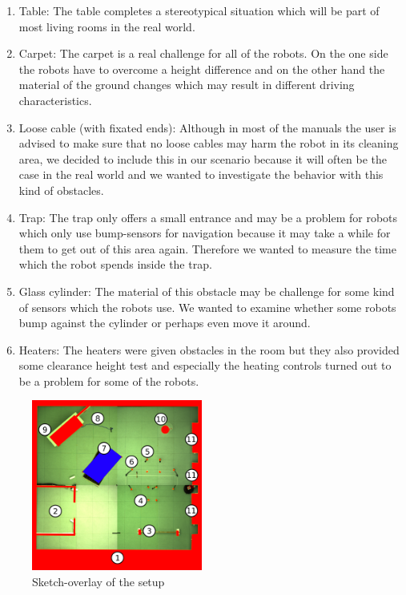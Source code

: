 \documentclass[twoside]{article}
\begin{document}
\begin{enumerate}
\item Table: The table completes a stereotypical situation which will be part of most living rooms in the real world.

\item Carpet: The carpet is a real challenge for all of the robots. On the one side the robots have to overcome a height difference and on the other hand the material of the ground changes which may result in different driving characteristics. 

\item Loose cable (with fixated ends): Although in most of the manuals the user is advised to make sure that no loose cables may harm the robot in its cleaning area, we decided to include this in our scenario because it will often be the case in the real world and we wanted to investigate the behavior with this kind of obstacles.

\item Trap: The trap only offers a small entrance and may be a problem for robots which only use bump-sensors for navigation because it may take a while for them to get out of this area again. Therefore we wanted to measure the time which the robot spends inside the trap.

\item Glass cylinder: The material of this obstacle may be challenge for some kind of sensors which the robots use. We wanted to examine whether some robots bump against the cylinder or perhaps even move it around.

\item Heaters: The heaters were given obstacles in the room but they also provided some clearance height test and especially the heating controls turned out to be a problem for some of the robots.
\end{enumerate}

\begin{figure}[H]
	\centering
	\includegraphics[width=0.5\textwidth]{pictures/senario_with_walls_picBack_labels.png}
	\caption{Sketch-overlay of the setup}
	\label{fig:scenario}
\end{figure}
\end{document}
